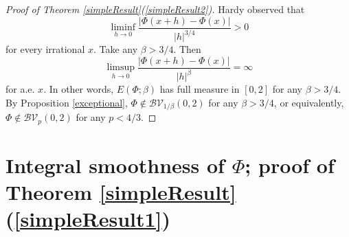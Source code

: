 \documentclass{amsart}
\numberwithin{equation}{section}
\begin{document}
\begin{proof}[Proof of Theorem \ref{simpleResult}(\ref{simpleResult2})]
    Hardy \cite[p. 323]{Ha1916} observed that 
    \begin{equation}
        \nonumber
        \liminf_{h\rightarrow0}\frac{|\Phi(x+h)-\Phi(x)|}{|h|^{3/4}}>0
    \end{equation}
    for every irrational $x$. Take any $\beta>3/4$. Then
    \begin{equation}
        \nonumber
        \limsup_{h\rightarrow0}\frac{|\Phi(x+h)-\Phi(x)|}{|h|^\beta}=\infty
    \end{equation}
    for a.e. $x$. In other words, $E(\Phi;\beta)$ has full measure in $[0,2]$ for any $\beta>3/4$. By Proposition \ref{exceptional}, $\Phi\notin\mathcal{BV}_{1/\beta}(0,2)$ for any $\beta>3/4$, or equivalently, $\Phi\notin\mathcal{BV}_p(0,2)$ for any $p<4/3$.
\end{proof}



\section{Integral smoothness of $\Phi$; proof of Theorem \ref{simpleResult}(\ref{simpleResult1})}
\end{document}
